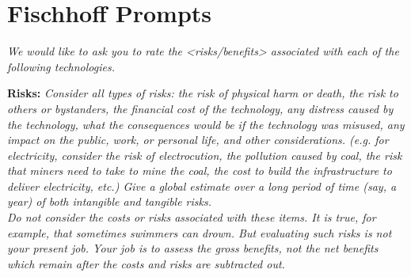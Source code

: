\documentclass{acm_proc_article-sp}
\begin{document}






\appendix
\section{Fischhoff Prompts}
\label{sec:prompt} 

\textit{We would like to ask you to rate the <risks/benefits> associated with each of the following technologies.}

{\bf Risks:} \textit{Consider all types of risks: the risk of physical harm or death, the risk to others or bystanders, the financial cost of the technology, any distress caused by the technology, what the consequences would be if the technology was misused, any impact on the public, work, or personal life, and other considerations. (e.g. for electricity, consider the risk of electrocution, the pollution caused by coal, the risk that miners need to take to mine the coal, the cost to build the infrastructure to deliver electricity, etc.) Give a global estimate over a long period of time (say, a year) of both intangible and tangible risks.} \\[-.6cm]

\textit{Do not consider the costs or risks associated with these items. It is true, for example, that sometimes swimmers can drown. But evaluating such risks is not your present job. Your job is to assess the gross benefits, not the net benefits which remain after the costs and risks are subtracted out.} \\[-.6cm]
\end{document}
